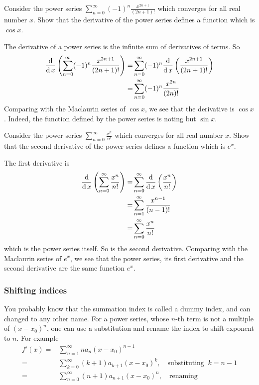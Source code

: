 \begin{example}
Consider the power series 
$\sum\limits_{n=0}^\infty(-1)^n \frac{x^{2n+1}}{(2n+1)!}$
which converges for all real number $x$.
Show that the derivative of the power series defines a function which is $\cos x$.
\end{example}
\begin{solution}
  The derivative of a power series is the infinite sum of derivatives of terms. So
  \[
    \begin{aligned}
      \frac{\operatorname{d}}{\operatorname{d} x}\left(\sum_{n=0}^\infty(-1)^n \frac{x^{2n+1}}{(2n+1)!}\right)
      =&\sum_{n=0}^\infty(-1)^n\frac{\operatorname{d}}{\operatorname{d} x}\left(\frac{x^{2n+1}}{(2n+1)!}\right)\\
      =&\sum_{n=0}^\infty(-1)^n \frac{x^{2n}}{(2n)!}
    \end{aligned}
  \]
  Comparing with the Maclaurin series of $\cos x$, we see that the derivative is $\cos x$. Indeed, the function defined by the power series is noting but $\sin x$.
\end{solution}

\begin{exercise}
  Consider the power series
  $\sum\limits_{n=0}^\infty \frac{x^n}{n!}$
which converges for all real number $x$.
Show that the second derivative of the power series defines a function which is $e^x$.
\end{exercise}
\begin{exersol}
The first derivative is
  \[
    \begin{aligned}
      \frac{\operatorname{d}}{\operatorname{d} x}\left(\sum_{n=0}^\infty\frac{x^n}{n!}\right)=&\sum_{n=0}^\infty\frac{\operatorname{d}}{\operatorname{d} x}\left(\frac{x^n}{n!}\right)\\
      =&\sum_{n=1}^\infty \frac{x^{n-1}}{(n-1)!}\\
      =&\sum_{n=0}^\infty \frac{x^n}{n!}\\
    \end{aligned}
  \]
  which is the power series itself. So is the second derivative.
  Comparing with the Maclaurin series of $e^x$, we see that the power series, its first derivative and the second derivative are the same function $e^x$.
\end{exersol}


\subsubsection*{Shifting indices}

You probably know that the summation index is called a dummy index, and can changed to any other name. For a power series, whose $n$-th term is not a multiple of $(x-x_0)^n$, one can use a substitution and rename the index to shift exponent to $n$. For example
\[
\begin{aligned}
  f'(x)=&\sum\limits_{n=1}^\infty na_n(x-x_0)^{n-1}\\
  =&\sum\limits_{k=0}^\infty (k+1)a_{k+1}(x-x_0)^k,\quad\text{substituting }~k=n-1\\
  =&\sum\limits_{n=0}^\infty (n+1)a_{n+1}(x-x_0)^n,\quad\text{renaming}\\
\end{aligned}  
\]

